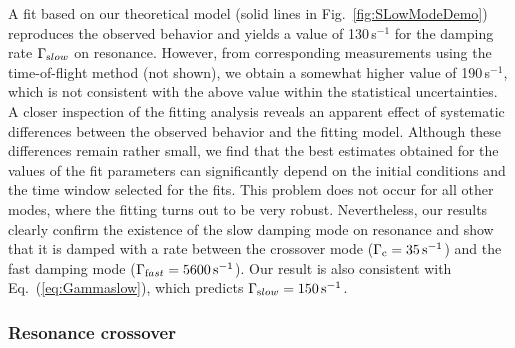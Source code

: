 A fit based on our theoretical model (solid lines in Fig.~\ref{fig:SLowModeDemo}) reproduces the observed behavior and yields a value of 130\,s$^{-1}$ for the damping rate $\Gamma_{\textrm slow}$ on resonance. However, from corresponding measurements using the time-of-flight method (not shown), we obtain a somewhat higher value of 190\,s$^{-1}$, which is not consistent with the above value within the statistical uncertainties. A closer inspection of the fitting analysis reveals an apparent effect of systematic differences between the observed behavior and the fitting model. Although these differences remain rather small, we find that the best estimates obtained for the values of the fit parameters can significantly depend on the initial conditions and the time window selected for the fits. This problem does not occur for all other modes, where the fitting turns out to be very robust. Nevertheless, our results clearly confirm the existence of the slow damping mode on resonance and show that it is damped with a rate between the crossover mode ($\Gamma_{\textrm c} = 35\,{\textrm s}^{-1}$) and the fast damping mode ($\Gamma_{\textrm fast} = 5600\,{\textrm s}^{-1}$). Our result is also consistent with Eq.~(\ref{eq:Gammaslow}), which predicts $\Gamma_{\textrm slow} = 150\,{\textrm s}^{-1}$.

\subsubsection{Resonance crossover}

